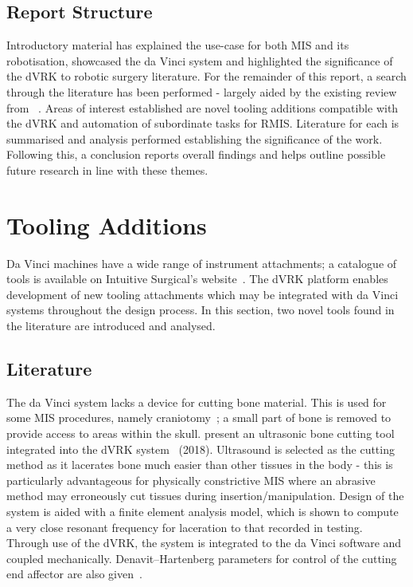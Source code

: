 \documentclass[english]{sobraep}
\begin{document}
\subsection{Report Structure}
Introductory material has explained the use-case for both MIS and its robotisation, showcased the da Vinci system and highlighted the significance of the dVRK to robotic surgery literature. For the remainder of this report, a search through the literature has been performed - largely aided by the existing review from \citeauthor{10-years-dvrk}~\cite{10-years-dvrk}. Areas of interest established are novel tooling additions compatible with the dVRK and automation of subordinate tasks for RMIS. Literature for each is summarised and analysis performed establishing the significance of the work. Following this, a conclusion reports overall findings and helps outline possible future research in line with these themes. 

\section{Tooling Additions}\label{sec:mechanical}
Da Vinci machines have a wide range of instrument attachments; a catalogue of tools is available on Intuitive Surgical's website~\cite{da-vinci-catalogue}. 
The dVRK platform enables development of new tooling attachments which may be integrated with da Vinci systems throughout the design process. In this section, two novel tools found in the literature are introduced and analysed. 
\subsection{Literature}
The da Vinci system lacks a device for cutting bone material. This is used for some MIS procedures, namely craniotomy~\cite{Fernandez-de_Thomas2022-ih};  a small part of bone is removed to provide access to areas within the skull. \citeauthor{bone-cutter} present an ultrasonic bone cutting tool integrated into the dVRK system~\cite{bone-cutter} (2018). Ultrasound is selected as the cutting method as it lacerates bone much easier than other tissues in the body - this is particularly advantageous for physically constrictive MIS where an abrasive method may erroneously cut tissues during insertion/manipulation. Design of the system is aided with a finite element analysis model, which is shown to compute a very close resonant frequency for laceration to that recorded in testing. Through use of the dVRK, the system is integrated to the da Vinci software and coupled mechanically. Denavit–Hartenberg parameters for control of the cutting end affector are also given~\cite[Table 3]{bone-cutter}. 
\end{document}
